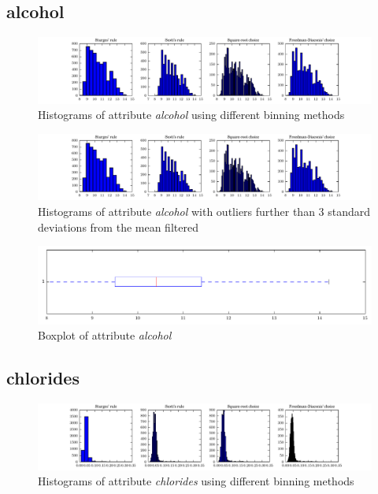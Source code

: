 \documentclass{report}
\begin{document}
\newpage\subsection{alcohol}
\begin{figure}[H]
\includegraphics[width=\textwidth]{histograms/alcohol.pdf}
\caption{Histograms of attribute \emph{alcohol} using different binning methods}\end{figure}

\begin{figure}[H]
\includegraphics[width=\textwidth]{histograms/alcohol_filtered.pdf}
\caption{Histograms of attribute \emph{alcohol} with outliers further than 3 standard deviations from the mean filtered}\n\end{figure}

\begin{figure}[H]
\includegraphics[width=\textwidth]{boxplots/alcohol.pdf}
\caption{Boxplot of attribute \emph{alcohol}}\end{figure}

\newpage\subsection{chlorides}
\begin{figure}[H]
\includegraphics[width=\textwidth]{histograms/chlorides.pdf}
\caption{Histograms of attribute \emph{chlorides} using different binning methods}\end{figure}
\end{document}
